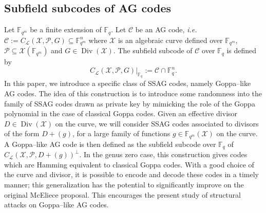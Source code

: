 \documentclass[a4paper]{amsart}
\theoremstyle{definition}
\theoremstyle{remark}
\newcommand{\calP}{\mathcal{P}}
\newcommand{\calL}{\mathcal{L}}
\newcommand{\calC}{\mathcal{C}}
\newcommand{\calX}{\mathcal{X}}
\newcommand{\fqm}{\mathbb{F}_{q^m}}
\newcommand{\fq}{\mathbb{F}_{q}}
\newcommand{\Div}{\operatorname{Div}}
\begin{document}
\subsection*{Subfield subcodes of AG codes}
Let $\fqm$ be a finite extension of $\fq$. Let $\calC$ be an AG code, \textit{i.e.} $\calC :=C_{\calL}(\calX,\calP,G) \subseteq \fqm^n$ where $\calX$ is an algebraic curve defined over $\fqm$, $\calP \subseteq \calX(\fqm)$ and $G \in \Div(\calX)$. The subfield subcode of $\calC$ over $\fq$ is defined by 
$$C_{\calL}(\calX,\calP,G)|_{\fq} := \calC \cap \fq^n.$$  
In this paper, we introduce a specific class of SSAG codes, namely Goppa--like AG codes. The idea of this construction is to introduce  some randomness into the family of SSAG codes drawn as private key by mimicking the role of the Goppa polynomial in the case of classical Goppa codes. Given an effective divisor $D\in \Div(\calX)$ on the curve, we will consider SSAG codes associated to divisors of the form $D+(g)$, for a large family of functions $g \in \fqm(\calX)$ on the curve. A Goppa--like AG code is then defined as the subfield subcode over $\fq$ of $C_{\calL}(\calX,\calP,D+(g))^{\perp}$. In the genus zero case, this construction gives codes which are Hamming equivalent to classical Goppa codes. With a good choice of the curve and divisor, it is possible to encode and decode these codes in a timely manner; this generalization has the potential to significantly improve on the original McEliece proposal. This encourages the present study of structural attacks on Goppa--like AG codes. 
\end{document}
